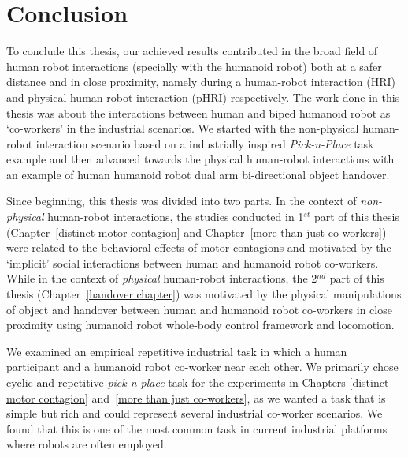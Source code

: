 
{\color{blue}\chapter*{Conclusion}}
\pagestyle{plain}

To conclude this thesis, our achieved results contributed in the broad field of human robot interactions (specially with the humanoid robot) both at a safer distance and in close proximity, namely during a human-robot interaction (HRI) and physical human robot interaction (pHRI) respectively. The work done in this thesis was about the interactions between human and biped humanoid robot as `co-workers' in the industrial scenarios. We started with the non-physical human-robot interaction scenario based on a industrially inspired \textit{Pick-n-Place} task example and then advanced towards the physical human-robot interactions with an example of human humanoid robot dual arm bi-directional object handover.

Since beginning, this thesis was divided into two parts. In the context of \textit{non-physical} human-robot interactions, the studies conducted in 1$^{st}$ part of this thesis (Chapter~\ref{distinct motor contagion} and Chapter~\ref{more than just co-workers}) were related to the behavioral effects of motor contagions and motivated by the `implicit' social interactions between human and humanoid robot co-workers. While in the context of \textit{physical} human-robot interactions, the 2$^{nd}$ part of this thesis (Chapter~\ref{handover chapter}) was motivated by the physical manipulations of object and handover between human and humanoid robot co-workers in close proximity using humanoid robot whole-body control framework and locomotion.

We examined an empirical repetitive industrial task in which a human participant and a humanoid robot co-worker near each other. We primarily chose cyclic and repetitive \textit{pick-n-place} task for the experiments in Chapters \ref{distinct motor contagion} and~\ref{more than just co-workers}, as we wanted a task that is simple but rich and could represent several industrial co-worker scenarios. We found that this is one of the most common task in current industrial platforms where robots are often employed.


